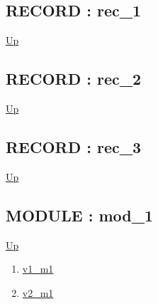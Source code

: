 \subsection*{RECORD : rec\_1}
\hypertarget{ecldoc:intest.in1intest.example_2.rec_1}{}
\par
\begin{minipage}[t]{\textwidth}
\begin{flushleft}
  
\end{flushleft}
\end{minipage}
\hyperlink{ecldoc:intest.in1intest.example_2}{Up} \\
\par
\par
\subsection*{RECORD : rec\_2}
\hypertarget{ecldoc:intest.in1intest.example_2.rec_2}{}
\par
\begin{minipage}[t]{\textwidth}
\begin{flushleft}
  
\end{flushleft}
\end{minipage}
\hyperlink{ecldoc:intest.in1intest.example_2}{Up} \\
\par
\par
\subsection*{RECORD : rec\_3}
\hypertarget{ecldoc:intest.in1intest.example_2.rec_3}{}
\par
\begin{minipage}[t]{\textwidth}
\begin{flushleft}
  
\end{flushleft}
\end{minipage}
\hyperlink{ecldoc:intest.in1intest.example_2}{Up} \\
\par
\par
\subsection*{MODULE : mod\_1}
\hypertarget{ecldoc:intest.in1intest.example_2.mod_1}{}
\par
\begin{minipage}[t]{\textwidth}
\begin{flushleft}
  
\end{flushleft}
\end{minipage}
\hyperlink{ecldoc:intest.in1intest.example_2}{Up} \\
\par
\par
\begin{enumerate}
\item \hyperlink{ecldoc:intest.in1intest.example_2.mod_1.v1_m1}{v1\_m1}
\item \hyperlink{ecldoc:intest.in1intest.example_2.mod_1.v2_m1}{v2\_m1}
\end{enumerate}
